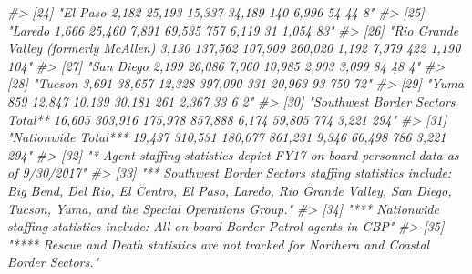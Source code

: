 \documentclass[
  12pt,
]{book}
\newenvironment{Shaded}{\begin{snugshade}}{\end{snugshade}}
\newcommand{\CommentTok}[1]{\textcolor[rgb]{0.56,0.35,0.01}{\textit{#1}}}
\begin{document}
\begin{Shaded}
\begin{Highlighting}[]
\CommentTok{\#> [24] "El Paso                                          2,182             25,193                   15,337                  34,189             140             6,996             54            44      8"    }
\CommentTok{\#> [25] "Laredo                                           1,666             25,460                    7,891                  69,535             757             6,119             31          1,054    83"    }
\CommentTok{\#> [26] "Rio Grande Valley (formerly McAllen)             3,130            137,562                  107,909                260,020             1,192            7,979            422          1,190   104"    }
\CommentTok{\#> [27] "San Diego                                        2,199             26,086                    7,060                  10,985            2,903            3,099             84            48      4"    }
\CommentTok{\#> [28] "Tucson                                           3,691             38,657                   12,328                397,090              331            20,963             93           750     72"    }
\CommentTok{\#> [29] "Yuma                                              859              12,847                   10,139                  30,181             261             2,367             33             6      2"    }
\CommentTok{\#> [30] "Southwest Border Sectors Total**                16,605            303,916                  175,978                857,888             6,174           59,805            774          3,221   294"    }
\CommentTok{\#> [31] "Nationwide Total***                             19,437            310,531                  180,077                861,231             9,346           60,498            786          3,221   294"    }
\CommentTok{\#> [32] "* Agent staffing statistics depict FY17 on{-}board personnel data as of 9/30/2017"                                                                                                                     }
\CommentTok{\#> [33] "** Southwest Border Sectors staffing statistics include: Big Bend, Del Rio, El Centro, El Paso, Laredo, Rio Grande Valley, San Diego, Tucson, Yuma, and the Special Operations Group."               }
\CommentTok{\#> [34] "*** Nationwide staffing statistics include: All on{-}board Border Patrol agents in CBP"                                                                                                                }
\CommentTok{\#> [35] "**** Rescue and Death statistics are not tracked for Northern and Coastal Border Sectors."}
\end{Highlighting}
\end{Shaded}
\end{document}
